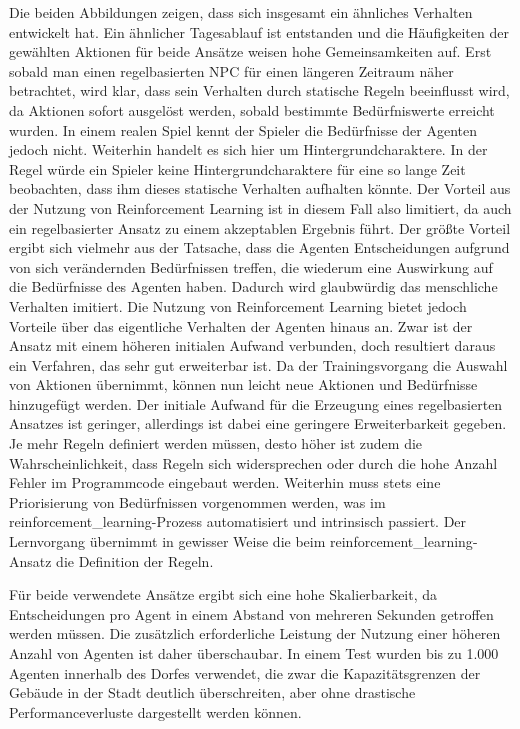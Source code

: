 Die beiden Abbildungen zeigen, dass sich insgesamt ein ähnliches Verhalten entwickelt hat. Ein ähnlicher Tagesablauf ist entstanden und die Häufigkeiten der gewählten Aktionen für beide Ansätze weisen hohe Gemeinsamkeiten auf. Erst sobald man einen regelbasierten NPC für einen längeren Zeitraum näher betrachtet, wird klar, dass sein Verhalten durch statische Regeln beeinflusst wird, da Aktionen sofort ausgelöst werden, sobald bestimmte Bedürfniswerte erreicht wurden. In einem realen Spiel kennt der Spieler die Bedürfnisse der Agenten jedoch nicht. Weiterhin handelt es sich hier um Hintergrundcharaktere. In der Regel würde ein Spieler keine Hintergrundcharaktere für eine so lange Zeit beobachten, dass ihm dieses statische Verhalten aufhalten könnte. Der Vorteil aus der Nutzung von Reinforcement Learning ist in diesem Fall also limitiert, da auch ein regelbasierter Ansatz zu einem akzeptablen Ergebnis führt. Der größte Vorteil ergibt sich vielmehr aus der Tatsache, dass die Agenten Entscheidungen aufgrund von sich verändernden Bedürfnissen treffen, die wiederum eine Auswirkung auf die Bedürfnisse des Agenten haben. Dadurch wird glaubwürdig das menschliche Verhalten imitiert.
Die Nutzung von Reinforcement Learning bietet jedoch Vorteile über das eigentliche Verhalten der Agenten hinaus an. Zwar ist der Ansatz mit einem höheren initialen Aufwand verbunden, doch resultiert daraus ein Verfahren, das sehr gut erweiterbar ist. Da der Trainingsvorgang die Auswahl von Aktionen übernimmt, können nun leicht neue Aktionen und Bedürfnisse hinzugefügt werden. Der initiale Aufwand für die Erzeugung eines regelbasierten Ansatzes ist geringer, allerdings ist dabei eine geringere Erweiterbarkeit gegeben. Je mehr Regeln definiert werden müssen, desto höher ist zudem die Wahrscheinlichkeit, dass Regeln sich widersprechen oder durch die hohe Anzahl Fehler im Programmcode eingebaut werden. Weiterhin muss stets eine Priorisierung von Bedürfnissen vorgenommen werden, was im \ac{reinforcement_learning}-Prozess automatisiert und intrinsisch passiert. Der Lernvorgang übernimmt in gewisser Weise die beim \ac{reinforcement_learning}-Ansatz die Definition der Regeln.


Für beide verwendete Ansätze ergibt sich eine hohe Skalierbarkeit, da Entscheidungen pro Agent in einem Abstand von mehreren Sekunden getroffen werden müssen. Die zusätzlich erforderliche Leistung der Nutzung einer höheren Anzahl von Agenten ist daher überschaubar. In einem Test wurden bis zu 1.000 Agenten innerhalb des Dorfes verwendet, die zwar die Kapazitätsgrenzen der Gebäude in der Stadt deutlich überschreiten, aber ohne drastische Performanceverluste dargestellt werden können. 
